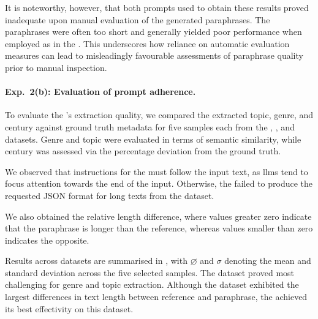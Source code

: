 It is noteworthy, however, that both prompts used to obtain these results proved inadequate upon manual evaluation of the generated paraphrases. 
The paraphrases were often too short and generally yielded poor performance when employed as \imps{} in the \impAppr{}. 
This underscores how reliance on automatic evaluation measures can lead to misleadingly favourable assessments of paraphrase quality prior to manual inspection.


\paragraph{Exp.\ 2(b): Evaluation of prompt adherence.}

To evaluate the \pextractor{}'s extraction quality, we compared the extracted topic, genre, and century against ground truth metadata for five samples each from the \dataBlog{}, \dataGutenberg{}, and \dataStudent{} datasets.
Genre and topic were evaluated in terms of semantic similarity, while century was assessed via the percentage deviation from the ground truth.

We observed that instructions for the \pextractor{} must follow the input text, as \acp{llm} tend to focus attention towards the end of the input. 
Otherwise, the \pextractor{} failed to produce the requested JSON format for long texts from the \dataGutenberg{} dataset. 


We also obtained the relative length difference, where values greater zero indicate that the paraphrase is longer than the reference, whereas values smaller than zero indicates the opposite.

Results across datasets are summarised in , with $\diameter$ and $\sigma$ denoting the mean and standard deviation across the five selected samples. 
The \dataBlog{} dataset proved most challenging for genre and topic extraction. 
Although the \dataGutenberg{} dataset exhibited the largest differences in text length between reference and paraphrase, the \pextractor{} achieved its best effectivity on this dataset.


